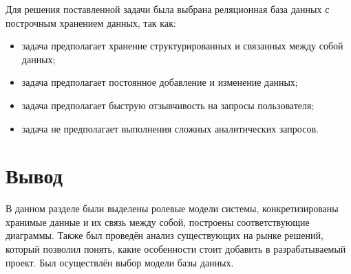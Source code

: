 Для решения поставленной задачи была выбрана реляционная база данных с построчным хранением данных, так как:

\begin{itemize}
    \item задача предполагает хранение структурированных и связанных между собой данных;
    \item задача предполагает постоянное добавление и изменение данных;
    \item задача предполагает быструю отзывчивость на запросы пользователя;
    \item задача не предполагает выполнения сложных аналитических запросов.
\end{itemize}

\section*{Вывод}

В данном разделе были выделены ролевые модели системы, конкретизированы хранимые данные и их связь между собой, построены соответствующие диаграммы. Также был проведён анализ существующих на рынке решений, который позволил понять, какие особенности стоит добавить в разрабатываемый проект. Был осуществлён выбор модели базы данных.